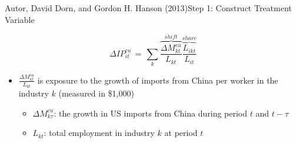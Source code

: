 \documentclass[dvipsnames,hyperref={pdfpagelabels=false}]{beamer}
\begin{document}
\begin{frame}{Autor, David Dorn, and Gordon H. Hanson (2013)}{Step 1: Construct Treatment Variable}

	\[ \Delta I P_{it}^{c u}\,=\,\sum_{k}\overbrace{\frac{\Delta M_{kt}^{cu}}{L_{kt}}}^{shift}\overbrace{\frac{L_{i k t}}{L_{i t}}}^{share} \]
	\begin{itemize}
		
		
		
		\item $\frac{\Delta M_{kt}^{cu}}{L_{kt}}$ is exposure to the growth of imports from China per worker  in the industry $k$ (measured in \$1,000)
									\vspace{0.2cm}
		\begin{itemize}
\item $\Delta M^{cu}_{k\tau}$: the growth in US imports from China during period $t$ and $t-\tau$
									\vspace{0.2cm}
		\item $L_{kt}$: total employment in industry $k$ at period $t$
		\end{itemize}
		

		

	\end{itemize}
\end{frame}
\end{document}
